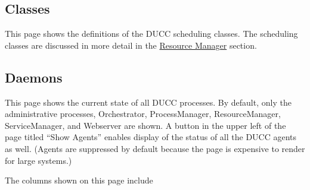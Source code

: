 \subsection{Classes}
This page shows the definitions of the DUCC scheduling classes.  The scheduling classes are
discussed in more detail in the \hyperref[sec:rm.job-classes]{Resource Manager} section.

\subsection{Daemons}

This page shows the current state of all DUCC processes.  By default, only the administrative
processes, Orchestrator, ProcessManager, ResourceManager, ServiceManager, and Webserver are
shown.  A button in the upper left of the page titled ``Show Agents'' enables display of
the status of all the DUCC agents as well. (Agents are suppressed by default because the
page is expensive to render for large systems.)

The columns shown on this page include

